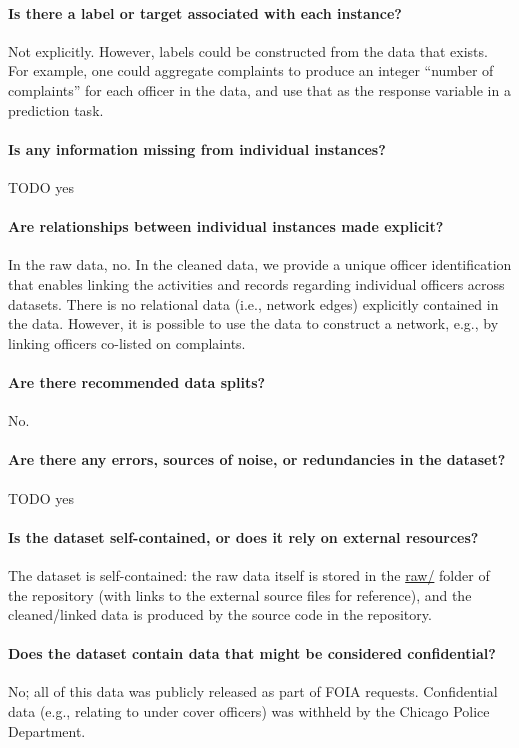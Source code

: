\paragraph{Is there a label or target associated with each instance?}
Not explicitly. However, labels could be constructed from the data 
that exists. For example, one could aggregate complaints to produce
an integer ``number of complaints'' for each officer in the data,
and use that as the response variable in a prediction task.

\paragraph{Is any information missing from individual instances?}
{\color{red} TODO yes}

\paragraph{Are relationships between individual instances made explicit?}
In the raw data, no. In the cleaned data, we provide a unique officer
identification that enables linking the activities and records regarding
individual officers across datasets. There is no relational data (i.e., network edges)
explicitly contained in the data. However, it is possible to use the data
to construct a network, e.g., by linking officers co-listed on complaints.

\paragraph{Are there recommended data splits?}
No.

\paragraph{Are there any errors, sources of noise, or redundancies in the dataset?}
{\color{red} TODO yes}

\paragraph{Is the dataset self-contained, or does it rely on external resources?}
The dataset is self-contained: the raw data itself is stored in the \url{raw/} folder of the repository 
(with links to the external source files for reference), 
and the cleaned/linked data is produced by the source code in the repository.

\paragraph{Does the dataset contain data that might be considered confidential?}
No; all of this data was publicly released as part of FOIA requests. 
Confidential data (e.g., relating to under cover officers) was withheld 
by the Chicago Police Department.

